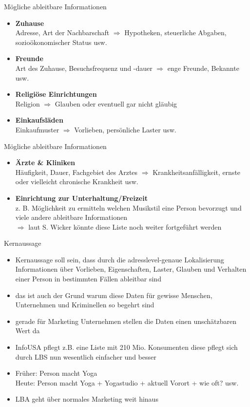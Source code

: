 \begin{frame}{Mögliche ableitbare Informationen}
  \begin{itemize}
  \item \textbf{Zuhause}\\
  Adresse, Art der Nachbarschaft $\Rightarrow$ Hypotheken, steuerliche Abgaben, sozioökonomischer Status usw.
  \item \textbf{Freunde}\\
  Art des Zuhause, Besuchsfrequenz und -dauer $\Rightarrow$ enge Freunde, Bekannte usw.
  \item \textbf{Religiöse Einrichtungen}\\
  Religion $\Rightarrow$ Glauben oder eventuell gar nicht gläubig
  \item \textbf{Einkaufsläden}\\
  Einkaufmuster $\Rightarrow$ Vorlieben, persönliche Laster usw.
  \end{itemize}
\end{frame}

\begin{frame}{Mögliche ableitbare Informationen}
  \begin{itemize}
  \item \textbf{Ärzte \& Kliniken}\\
  Häufigkeit, Dauer, Fachgebiet des Arztes $\Rightarrow$ Krankheitsanfälligkeit, ernste oder
  vielleicht chronische Krankheit usw.
  \item \textbf{Einrichtung zur Unterhaltung/Freizeit}\\
  z. B. Möglichkeit zu ermitteln welchen Musikstil eine Person bevorzugt und viele andere ableitbare Informationen \\ \vspace{.2cm}
  \hspace{-.5cm} $\Rightarrow$ laut S. Wicker könnte diese Liste noch weiter fortgeführt werden
  \end{itemize}
\end{frame}

\begin{frame}{Kernaussage}
  \begin{itemize}
  \item Kernaussage soll sein, dass durch die adresslevel-genaue Lokalisierung Informationen über Vorlieben,
  Eigenschaften, Laster, Glauben und Verhalten einer Person in bestimmten Fällen ableitbar sind
  \item das ist auch der Grund warum diese Daten für gewisse Menschen, Unternehmen und Kriminellen so begehrt sind
  \item gerade für Marketing Unternehmen stellen die Daten einen unschätzbaren Wert da
  \item InfoUSA pflegt z.B. eine Liste mit 210 Mio. Konsumenten diese pflegt sich durch LBS nun wesentlich einfacher und besser
  \item Früher: Person macht Yoga\\
  Heute: Person macht Yoga + Yogastudio + aktuell Vorort + wie oft? usw.
  \item LBA geht über normales Marketing weit hinaus
  \end{itemize}
\end{frame}

